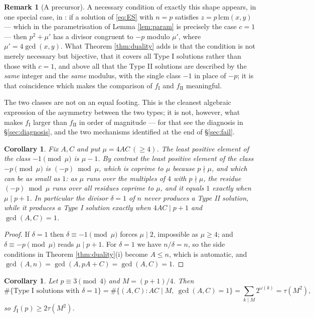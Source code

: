 \documentclass[11pt,reqno]{amsart}
\theoremstyle{plain}
\newtheorem{corollary}[theorem]{Corollary}
\theoremstyle{definition}
\newtheorem{remark}[theorem]{Remark}
\numberwithin{equation}{section}
\newcommand{\fI}{f_{\mathrm{I}}}
\newcommand{\fII}{f_{\mathrm{II}}}
\begin{document}
\begin{remark}[A precursor]\label{rem:mvg}
A necessary condition of exactly this shape appears, in one special case, in
\cite[Thm.~2.1(g)]{MonksVelingker}: if a solution of \eqref{eq:ES} with $n=p$ satisfies
$z=p\,\mathrm{lcm}(x,y)$ --- which in the parametrisation of Lemma \ref{lem:param} is
precisely the case $c=1$ --- then $p^{2}+\mu'$ has a divisor congruent to $-p$ modulo
$\mu'$, where $\mu'=4\gcd(x,y)$. What Theorem \ref{thm:duality} adds is that the
condition is not merely necessary but bijective, that it covers all Type I solutions
rather than those with $c=1$, and above all that the Type II solutions are described by
the \emph{same} integer and the \emph{same} modulus, with the single class $-1$ in
place of $-p$; it is that coincidence which makes the comparison of $\fI$ and $\fII$
meaningful.
\end{remark}

The two classes are not on an equal footing. This is the cleanest algebraic expression
of the asymmetry between the two types; it is not, however, what makes $\fI$ larger than
$\fII$ in order of magnitude --- for that see the diagnosis in \S\ref{sec:diagnosis}, and
the two mechanisms identified at the end of \S\ref{sec:fail}.

\begin{corollary}\label{cor:smallest}
Fix $A,C$ and put $\mu=4AC\ (\ge4)$. The least positive element of the class
$-1\pmod\mu$ is $\mu-1$. By contrast the least positive element of the class
$-p\pmod\mu$ is $(-p)\bmod\mu$, which is coprime to $\mu$ because $p\nmid\mu$, and which
can be as small as $1$: as $\mu$ runs over the multiples of $4$ with $p\nmid\mu$, the
residue $(-p)\bmod\mu$ runs over all residues coprime to $\mu$, and it equals $1$
exactly when $\mu\mid p+1$. In particular the divisor $\delta=1$ of $n$ never produces
a Type II solution, while it produces a Type I solution exactly when $4AC\mid p+1$ and
$\gcd(A,C)=1$.
\end{corollary}

\begin{proof}
If $\delta=1$ then $\delta\equiv-1\pmod \mu$ forces $\mu\mid2$, impossible as $\mu\ge4$;
and $\delta\equiv-p\pmod \mu$ reads $\mu\mid p+1$. For $\delta=1$ we have $n/\delta=n$, so
the side conditions in Theorem \ref{thm:duality}(i) become $A\le n$, which is
automatic, and $\gcd(A,n)=\gcd(A,pA+C)=\gcd(A,C)=1$.
\end{proof}

\begin{corollary}\label{cor:tau}
Let $p\equiv3\pmod4$ and $M=(p+1)/4$. Then
\[
  \#\{\text{Type I solutions with }\delta=1\}=\#\{(A,C):AC\mid M,\ \gcd(A,C)=1\}
  =\sum_{k\mid M}2^{\omega(k)}=\tau(M^{2}),
\]
so $\fI(p)\ge2\tau(M^{2})$.
\end{corollary}
\end{document}

